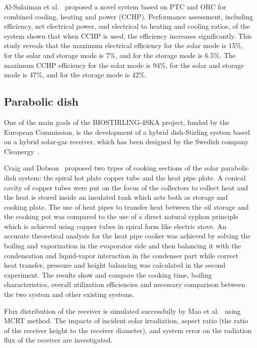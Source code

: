 Al-Sulaiman et al.~\cite{AlSulaiman2012} proposed a novel system based on PTC and ORC for combined cooling, heating and power (CCHP). Performance assessment, including efficiency, net electrical power, and electrical to heating and cooling ratios, of the system shown that when CCHP is used, the efficiency increases significantly. This study reveals that the maximum electrical efficiency for the solar mode is 15\%, for the solar and storage mode is 7\%, and for the storage mode is 6.5\%. The maximum CCHP efficiency for the solar mode is 94\%, for the solar and storage mode is 47\%, and for the storage mode is 42\%.

\subsection{Parabolic dish}\label{sec:pd}

One of the main goals of the BIOSTIRLING-4SKA project, funded by the European Commission, is the development of a hybrid dish-Stirling system based on a hybrid solar-gas receiver, which has been designed by the Swedish company Cleanergy~\cite{Blazquez2016}.

Craig and Dobson~\cite{Craig2016b} proposed two types of cooking sections of the solar parabolic dish system: the spiral hot plate copper tube and the heat pipe plate. A conical cavity of copper tubes were put on the focus of the collectors to collect heat and the heat is stored inside an insulated tank which acts both as storage and cooking plate. The use of heat pipes to transfer heat between the oil storage and the cooking pot was compared to the use of a direct natural syphon principle which is achieved using copper tubes in spiral form like electric stove. An accurate theoretical analysis for the heat pipe cooker was achieved by solving the boiling and vaporization in the evaporator side and then balancing it with the condensation and liquid-vapor interaction in the condenser part while correct heat transfer, pressure and height balancing was calculated in the second experiment. The results show and compare the cooking time, boiling characteristics, overall utilization efficiencies and necessary comparison between the two system and other existing systems.

Flux distribution of the receiver is simulated successfully by Mao et al.~\cite{Mao2014b} using MCRT method. The impacts of incident solar irradiation, aspect ratio (the ratio of the receiver height to the receiver diameter), and system error on the radiation flux of the receiver are investigated.

